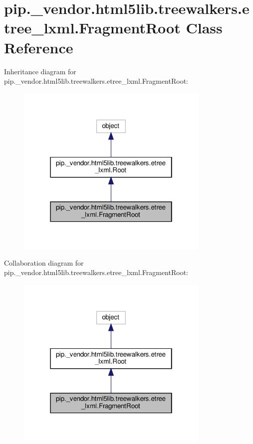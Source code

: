\hypertarget{classpip_1_1__vendor_1_1html5lib_1_1treewalkers_1_1etree__lxml_1_1FragmentRoot}{}\section{pip.\+\_\+vendor.\+html5lib.\+treewalkers.\+etree\+\_\+lxml.\+Fragment\+Root Class Reference}
\label{classpip_1_1__vendor_1_1html5lib_1_1treewalkers_1_1etree__lxml_1_1FragmentRoot}


Inheritance diagram for pip.\+\_\+vendor.\+html5lib.\+treewalkers.\+etree\+\_\+lxml.\+Fragment\+Root\+:
\nopagebreak
\begin{figure}[H]
\begin{center}
\leavevmode
\includegraphics[width=262pt]{classpip_1_1__vendor_1_1html5lib_1_1treewalkers_1_1etree__lxml_1_1FragmentRoot__inherit__graph}
\end{center}
\end{figure}


Collaboration diagram for pip.\+\_\+vendor.\+html5lib.\+treewalkers.\+etree\+\_\+lxml.\+Fragment\+Root\+:
\nopagebreak
\begin{figure}[H]
\begin{center}
\leavevmode
\includegraphics[width=262pt]{classpip_1_1__vendor_1_1html5lib_1_1treewalkers_1_1etree__lxml_1_1FragmentRoot__coll__graph}
\end{center}
\end{figure}
